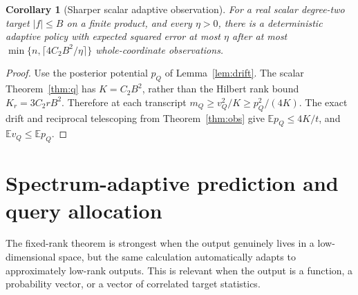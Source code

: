 \documentclass[11pt,letterpaper]{article}
\newtheorem{corollary}[theorem]{Corollary}
\theoremstyle{definition}
\newcommand{\E}{\mathbb E}
\begin{document}
\begin{corollary}[Sharper scalar adaptive observation]\label{cor:scalarobs}
For a real scalar degree-two target $|f|\le B$ on a finite
product, and every $\eta>0$, there is a deterministic adaptive policy
with expected squared error at most $\eta$ after at most
$\min\{n,\lceil 4C_2 B^2/\eta\rceil\}$ whole-coordinate observations.
\end{corollary}
\begin{proof}
Use the posterior potential $p_Q$ of Lemma~\ref{lem:drift}.
The scalar Theorem~\ref{thm:q} has $K=C_2B^2$, rather than the
Hilbert rank bound $K_r=3C_2rB^2$.
Therefore at each transcript $m_Q\ge v_Q^2/K\ge p_Q^2/(4K)$.
The exact drift and reciprocal telescoping from Theorem~\ref{thm:obs}
give $\E p_Q\le4K/t$, and $\E v_Q\le\E p_Q$.
\end{proof}

\section{Spectrum-adaptive prediction and query allocation}\label{sec:spectral}
The fixed-rank theorem is strongest when the output genuinely lives in a
low-dimensional space, but the same calculation automatically adapts to
approximately low-rank outputs. This is relevant when the output is a
function, a probability vector, or a vector of correlated target statistics.
\end{document}
